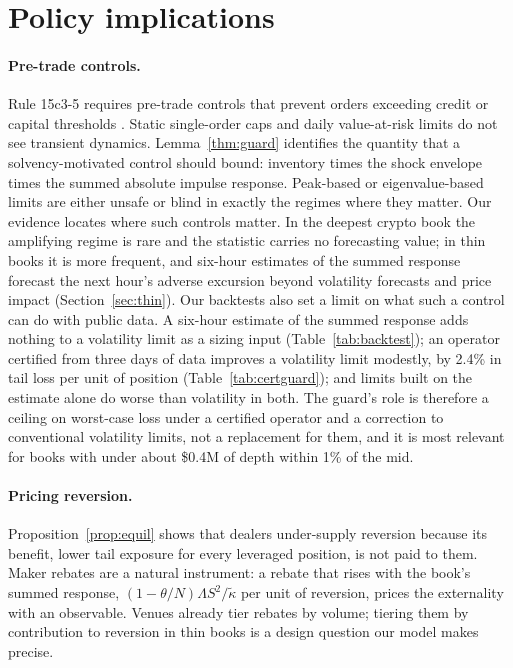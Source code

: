 \documentclass[12pt]{article}
\theoremstyle{definition}
\theoremstyle{remark}
\begin{document}
\section{Policy implications}\label{sec:policy}

\paragraph{Pre-trade controls.} Rule 15c3-5 requires pre-trade controls that prevent orders exceeding credit or capital thresholds \citep{sec2010}. Static single-order caps and daily value-at-risk limits do not see transient dynamics. Lemma~\ref{thm:guard} identifies the quantity that a solvency-motivated control should bound: inventory times the shock envelope times the summed absolute impulse response. Peak-based or eigenvalue-based limits are either unsafe or blind in exactly the regimes where they matter. Our evidence locates where such controls matter. In the deepest crypto book the amplifying regime is rare and the statistic carries no forecasting value; in thin books it is more frequent, and six-hour estimates of the summed response forecast the next hour's adverse excursion beyond volatility forecasts and price impact (Section~\ref{sec:thin}). Our backtests also set a limit on what such a control can do with public data. A six-hour estimate of the summed response adds nothing to a volatility limit as a sizing input (Table~\ref{tab:backtest}); an operator certified from three days of data improves a volatility limit modestly, by 2.4\% in tail loss per unit of position (Table~\ref{tab:certguard}); and limits built on the estimate alone do worse than volatility in both. The guard's role is therefore a ceiling on worst-case loss under a certified operator and a correction to conventional volatility limits, not a replacement for them, and it is most relevant for books with under about \$0.4M of depth within 1\% of the mid.

\paragraph{Pricing reversion.} Proposition~\ref{prop:equil} shows that dealers under-supply reversion because its benefit, lower tail exposure for every leveraged position, is not paid to them. Maker rebates are a natural instrument: a rebate that rises with the book's summed response, $(1-\theta/N)\Lambda S^2/\tilde\kappa$ per unit of reversion, prices the externality with an observable. Venues already tier rebates by volume; tiering them by contribution to reversion in thin books is a design question our model makes precise.
\end{document}
